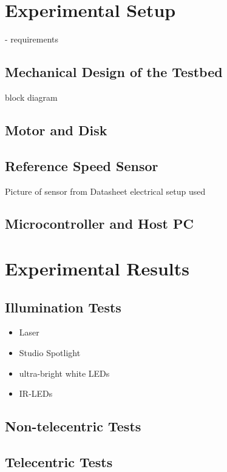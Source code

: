 \documentclass[12pt,a4paper]{article}
\begin{document}
\newpage
\section{Experimental Setup}

- requirements

\subsection{Mechanical Design of the Testbed}

block diagram

\subsection{Motor and Disk}

\subsection{Reference Speed Sensor}
\label{lb}

      Picture of sensor from Datasheet
      electrical setup used

\subsection{Microcontroller and Host PC}      

\clearpage
\section{Experimental Results}
\label{exp}

\subsection{Illumination Tests}

\begin{itemize}
  \item Laser
  \item Studio Spotlight
  \item ultra-bright white LEDs
  \item IR-LEDs
\end{itemize}

\subsection{Non-telecentric Tests}

\subsection{Telecentric Tests}
\end{document}
